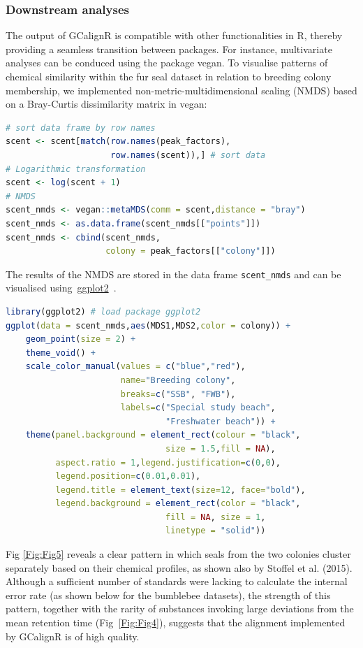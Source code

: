 \documentclass[10pt,letterpaper]{article}
\begin{document}
\subsubsection*{Downstream analyses}
The output of GCalignR is compatible with other functionalities in R, thereby providing a seamless transition between packages. For instance, multivariate analyses can be conduced using the package vegan. To visualise patterns of chemical similarity within the fur seal dataset in relation to breeding colony membership, we implemented non-metric-multidimensional scaling (NMDS) based on a Bray-Curtis dissimilarity matrix in vegan:

\begin{lstlisting}[language=R]
# sort data frame by row names
scent <- scent[match(row.names(peak_factors),
                     row.names(scent)),] # sort data 
# Logarithmic transformation
scent <- log(scent + 1) 
# NMDS
scent_nmds <- vegan::metaMDS(comm = scent,distance = "bray") 
scent_nmds <- as.data.frame(scent_nmds[["points"]]) 
scent_nmds <- cbind(scent_nmds,
                    colony = peak_factors[["colony"]]) 
\end{lstlisting}

The results of the NMDS are stored in the data frame \texttt{scent\_nmds} and can be visualised using~\href{https://CRAN.R-project.org/package=ggplot2}{ggplot2}~\cite{Wickham.2009}.

\begin{lstlisting}[language=R]
library(ggplot2) # load package ggplot2
ggplot(data = scent_nmds,aes(MDS1,MDS2,color = colony)) +
    geom_point(size = 2) + 
    theme_void() + 
    scale_color_manual(values = c("blue","red"), 
                       name="Breeding colony",
                       breaks=c("SSB", "FWB"),
                       labels=c("Special study beach", 
                                "Freshwater beach")) +
    theme(panel.background = element_rect(colour = "black",
                                size = 1.5,fill = NA),
          aspect.ratio = 1,legend.justification=c(0,0), 
          legend.position=c(0.01,0.01),
          legend.title = element_text(size=12, face="bold"),
          legend.background = element_rect(color = "black",
                                fill = NA, size = 1, 
                                linetype = "solid")) 
\end{lstlisting}

Fig \ref{Fig:Fig5} reveals a clear pattern in which seals from the two colonies cluster separately based on their chemical profiles, as shown also by Stoffel et al. (2015). Although a sufficient number of standards were lacking to calculate the internal error rate (as shown below for the bumblebee datasets), the strength of this pattern, together with the rarity of substances invoking large deviations from the mean retention time (Fig~\ref{Fig:Fig4}), suggests that the alignment implemented by GCalignR is of high quality.\par
\end{document}
